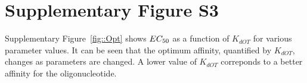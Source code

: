 \documentclass[a4paper,11pt]{article}
\newcommand{\EC}{EC_{\rm{50}}}
\begin{document}
\section{Supplementary Figure S3}
Supplementary Figure~\ref{fig::Opt} shows $\EC$ as a function of $K_{dOT}$ for various parameter values. It can be seen that the optimum affinity, quantified by $K_{dOT}$, changes as parameters are changed. A lower value of $K_{dOT}$ correponds to a better affinity for the oligonucleotide.
%  
% 
%  
\end{document}
